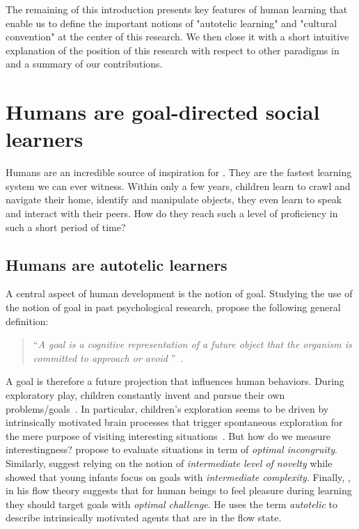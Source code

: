 The remaining of this introduction presents key features of human learning that enable us to define the important notions of "autotelic learning" and "cultural convention" at the center of this research. We then close it with a short intuitive explanation of the position of this research with respect to other paradigms in \ai and a summary of our contributions.


\section{Humans are goal-directed social learners}

Humans are an incredible source of inspiration for \ai. They are the fastest learning system we can ever witness. Within only a few years, children learn to crawl and navigate their home, identify and manipulate objects, they even learn to speak and interact with their peers. How do they reach such a level of proficiency in such a short period of time? 

\subsection{Humans are autotelic learners}
\label{sec:humans_autotelic}

A central aspect of human development is the notion of goal. Studying the use of the notion of goal in past psychological research, \citet{elliot2008goal} propose the following general definition:
\begin{quote}
   	``\textit{A goal is a cognitive representation of a future object that the organism is committed to approach or
    avoid} ''~\citep{elliot2008goal}.
\end{quote}
%
A goal is therefore a future projection that influences human behaviors. During exploratory play, children constantly invent and pursue their own problems/goals~\citep{chu2020exploratory}. In particular, children's exploration seems to be driven by intrinsically motivated brain processes that trigger spontaneous exploration for the mere purpose of visiting interesting situations~\citep{gopnik1999scientist,kaplan2007search,kidd_psychology_2015}. But how do we measure interestingness?  \citet{hunt1965} propose to evaluate situations in term of \textit{optimal incongruity}. Similarly, \citet{berlyne1966curiosity} suggest relying on the notion of \textit{intermediate level of novelty} while \citet{Kidd2012TheGE} showed that young infants focus on goals with \textit{intermediate complexity}.  Finally, \citet{csikzentmihalyi1997finding}, in his flow theory suggests that for human beings to feel pleasure during learning they should target goals with \textit{optimal challenge}. He uses the term \textit{autotelic} to describe intrinsically motivated agents that are in the flow state. 

